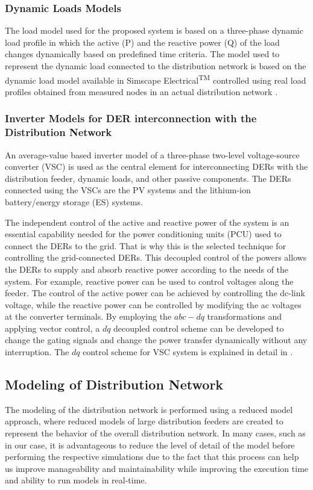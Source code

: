 \subsubsection{Dynamic Loads Models}
The load model used for the proposed system is based on a three-phase dynamic load profile in which the active (P) and the reactive power (Q) of the load changes dynamically based on predefined time criteria. The model used to represent the dynamic load connected to the distribution network is based on the dynamic load model available in Simscape Electrical\textsuperscript{TM} controlled using real load profiles obtained from measured nodes in an actual distribution network \cite{sungrin}. 

\subsubsection{Inverter Models for DER interconnection with the Distribution Network }An average-value based inverter model of a three-phase two-level voltage-source converter (VSC) is used as the central element for interconnecting DERs with the distribution feeder, dynamic loads, and other passive components. The DERs connected using the VSCs are the PV systems and the lithium-ion battery/energy storage (ES) systems. 

The independent control of the active and reactive power of the system is an essential capability needed for the power conditioning units (PCU) used to connect the DERs to the grid. That is why this is the selected technique for controlling the grid-connected DERs. This decoupled control of the powers allows the DERs to supply and absorb reactive power according to the needs of the system. For example, reactive power can be used to control voltages along the feeder. The control of the active power can be achieved by controlling the dc-link voltage, while the reactive power can be controlled by modifying the ac voltages at the converter terminals. By employing the \(abc-dq\) transformations and applying vector control, a \(dq\) decoupled control scheme can be developed to change the gating signals and change the power transfer dynamically without any interruption. The \(dq\) control scheme for VSC system is explained in detail in \cite{yazdani}. 




\subsection{Modeling of Distribution Network}
The modeling of the distribution network is performed using a reduced model approach, where reduced models of large distribution feeders are created to represent the behavior of the overall distribution network. In many cases, such as in our case, it is advantageous to reduce the level of detail of the model before performing the respective simulations due to the fact that this process can help us improve manageability and maintainability while improving the execution time and ability to run models in real-time. 

